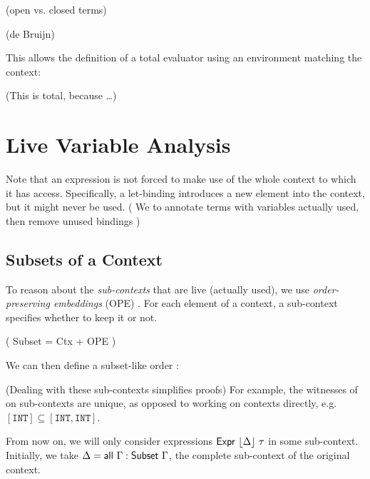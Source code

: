 \documentclass[11pt,a4paper]{article}
\newcommand{\Draft}[1]{{\color{gray}(#1)}}
\newcommand{\Todo}[1]{\todo[inline,backgroundcolor=orange!30]{TODO: #1}}
\newcommand{\I}[1]{\texttt{#1}\xspace}
\newcommand{\Floor}[1]{\lfloor #1 \rfloor\xspace}
\begin{document}
\CodeLangTypes

\Draft{open vs. closed terms}

\CodeLangCtx

\Draft{de Bruijn}

\CodeLangRef

\CodeLangExpr

This allows the definition of a total evaluator
using an environment matching the context:

\CodeLangSemantics

\Draft{This is total, because \ldots}


\section{Live Variable Analysis}

Note that an expression is not forced to make use of the whole context to which it has access.
Specifically, a let-binding introduces a new element into the context, but it might never be used.
\Draft{
We to annotate terms with variables actually used,
then remove unused bindings
}
\cite{nielsen1999analysis}

\subsection{Subsets of a Context}

To reason about the \emph{sub-contexts} that are live (actually used),
we use \emph{order-preserving embeddings} (OPE) \cite{chapman2009type}.
For each element of a context, a sub-context specifies whether to keep it or not.

\Draft{
  Subset = Ctx + OPE
}

\CodeSubsetSubset

We can then define a subset-like order \AgdaFunction{$\subseteq$}:

\CodeSubsetOpSubseteq

\Draft{Dealing with these sub-contexts simplifies proofs}
For example, the witnesses of \AgdaFunction{$\subseteq$} on sub-contexts are unique,
as opposed to working on contexts directly, e.g. $[\I{INT}] \subseteq [\I{INT}, \I{INT}]$.
\Todo{Clarify this?}

From now on, we will only consider expressions
$\AgdaDatatype{Expr}\ \Floor{\Delta}\ \tau$ in some sub-context.
Initially, we take $\Delta = \AgdaFunction{all}\ \Gamma : \AgdaDatatype{Subset}\ \Gamma$,
the complete sub-context of the original context.
\end{document}
